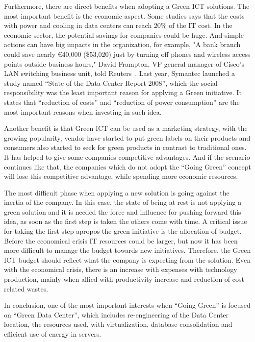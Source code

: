     Furthermore, there are direct benefits when adopting a Green ICT solutions. The most important benefit is the economic aspect. Some studies says that the costs with power and cooling in data centers can reach 20\% of the IT cost. In the economic sector, the potential savings for companies could be huge. And simple actions can have big impacts in the organization, for example, "A bank branch could save nearly \euro40,000 (\$53,020) just by turning off phones and wireless access points outside business hours," David Frampton, VP general manager of Cisco's LAN switching business unit, told Reuters~\cite{Chestney2009}. Last year, Symantec launched a study named ``State of the Data Center Report 2008'', which the social responsibility was the least important reason for applying a Green initiative. It states that ``reduction of costs'' and ``reduction of power consumption'' are the most important reasons when investing in such idea. 
    
    Another benefit is that Green ICT can be used as a marketing strategy, with the growing popularity, vendor have started to put green labels on their products and consumers also started to seek for green products in contrast to traditional ones. It has helped to give some companies competitive advantages. And if the scenario continues like that, the companies which do not adopt the ``Going Green'' concept will lose this competitive advantage, while spending more economic resources.
    
    The most difficult phase when applying a new solution is going against the inertia of the company. In this case, the state of being at rest is not applying a green solution and it is needed the force and influence for pushing forward this idea, as soon as the first step is taken the others come with time. A critical issue for taking the first step apropos the green initiative is the allocation of budget. Before the economical crisis IT resources could be larger, but now it has been more difficult to manage the budget towards new initiatives. Therefore, the Green ICT budget should reflect what the company is expecting from the solution. Even with the economical crisis, there is an increase with expenses with technology production, mainly when allied with productivity increase and reduction of cost related wastes. 
    
    In conclusion, one of the most important interests when ``Going Green'' is focused on ``Green Data Center'', which includes re-engineering of the Data Center location, the resources used, with virtualization, database consolidation and efficient use of energy in servers. 

